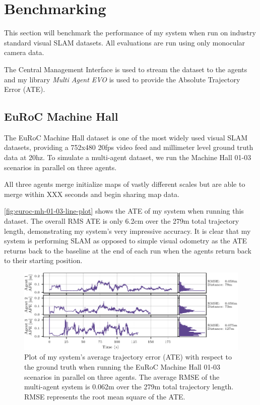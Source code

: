 \section{Benchmarking}
\label{sec:benchmarking}
This section will benchmark the performance of my system when run on industry standard visual SLAM datasets. All evaluations are run using only monocular camera data.

The Central Management Interface is used to stream the dataset to the agents and my library \textit{Multi Agent EVO} is used to provide the Absolute Trajectory Error (ATE).

\subsection{EuRoC Machine Hall}
\label{sec:euroc-machine-hall}
The EuRoC Machine Hall dataset \autocite{burri2016euroc} is one of the most widely used visual SLAM datasets, providing a 752x480 20fps video feed and millimeter level ground truth data at 20hz. To simulate a multi-agent dataset, we run the Machine Hall 01-03 scenarios in parallel on three agents.

All three agents merge initialize maps of vastly different scales but are able to merge within XXX seconds and begin sharing map data.

\autoref{fig:euroc-mh-01-03-line-plot} shows the ATE of my system when running this dataset. The overall RMS ATE is only 6.2cm over the 279m total trajectory length, demonstrating my system's very impressive accuracy. It is clear that my system is performing SLAM as opposed to simple visual odometry as the ATE returns back to the baseline at the end of each run when the agents return back to their starting position.

\begin{figure}[h]
  \centering
  \includegraphics[width=\linewidth]{figures/EuRoC_MH_01-03_line_plot.pdf}

  \caption{Plot of my system's average trajectory error (ATE) with respect to the ground truth when running the EuRoC Machine Hall 01-03 scenarios in parallel on three agents. The average RMSE of the multi-agent system is 0.062m over the 279m total trajectory length. \captionbreak RMSE represents the root mean square of the ATE.}
  \label{fig:euroc-mh-01-03-line-plot}
\end{figure}

